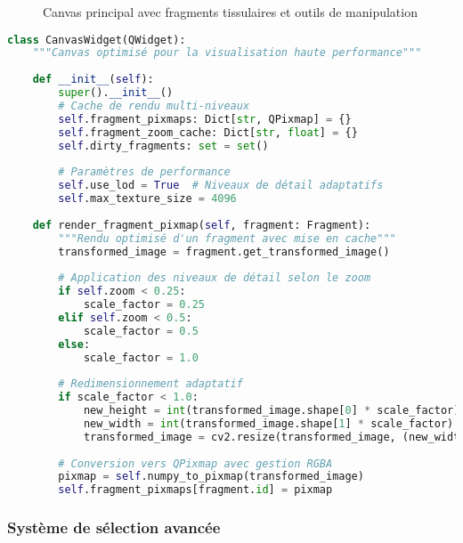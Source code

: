 \documentclass[12pt,a4paper]{report}
\begin{document}

\begin{figure}[H]
\centering
{}
\caption{Canvas principal avec fragments tissulaires et outils de manipulation}
\label{fig:canvas_fragments}
\end{figure}

\begin{lstlisting}[language=Python, caption=Optimisations du rendu Canvas]
class CanvasWidget(QWidget):
    """Canvas optimisé pour la visualisation haute performance"""
    
    def __init__(self):
        super().__init__()
        # Cache de rendu multi-niveaux
        self.fragment_pixmaps: Dict[str, QPixmap] = {}
        self.fragment_zoom_cache: Dict[str, float] = {}
        self.dirty_fragments: set = set()
        
        # Paramètres de performance
        self.use_lod = True  # Niveaux de détail adaptatifs
        self.max_texture_size = 4096
        
    def render_fragment_pixmap(self, fragment: Fragment):
        """Rendu optimisé d'un fragment avec mise en cache"""
        transformed_image = fragment.get_transformed_image()
        
        # Application des niveaux de détail selon le zoom
        if self.zoom < 0.25:
            scale_factor = 0.25
        elif self.zoom < 0.5:
            scale_factor = 0.5
        else:
            scale_factor = 1.0
        
        # Redimensionnement adaptatif
        if scale_factor < 1.0:
            new_height = int(transformed_image.shape[0] * scale_factor)
            new_width = int(transformed_image.shape[1] * scale_factor)
            transformed_image = cv2.resize(transformed_image, (new_width, new_height))
        
        # Conversion vers QPixmap avec gestion RGBA
        pixmap = self.numpy_to_pixmap(transformed_image)
        self.fragment_pixmaps[fragment.id] = pixmap
\end{lstlisting}

\subsubsection{Système de sélection avancée}
\end{document}
